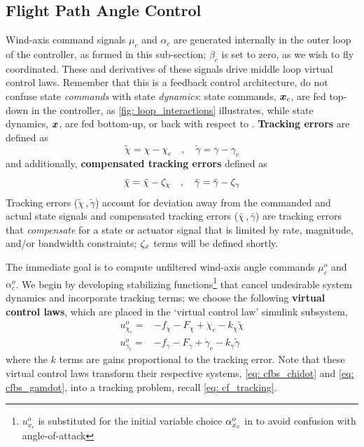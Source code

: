 \documentclass[12pt]{ucthesis}
\begin{document}
\subsection{Flight Path Angle Control}
\label{subsec: uav_flight_path}
%
Wind-axis command signals $\mu_c$ and $\alpha_c$ are generated internally in the outer loop of the controller, as formed in this sub-section; $\beta_c$ is set to zero, as we wish to fly coordinated. These and derivatives of these signals drive middle loop virtual control laws. Remember that this is a feedback control architecture, do not confuse state \textit{commands} with state \textit{dynamics}: state commands, $\boldsymbol{x}_c$, are fed top-down in the controller, as \autoref{fig: loop_interactions} illustrates, while state dynamics, $\boldsymbol{x}$, are fed bottom-up, or back with respect to . \textbf{Tracking errors} are defined as
	\begin{equation} \label{eq: cfbs_outer_etrk}
		\tilde{\chi}	= \chi	- \chi_c \quad,\quad
		\tilde{\gamma}	= \gamma- \gamma_c 
	\end{equation}
and additionally, \textbf{compensated tracking errors} defined as
	\begin{equation} \label{eq: cfbs_outer_ecmp}
		\bar{\chi}		= \tilde{\chi}	- \zeta_\chi \quad,\quad
		\bar{\gamma}	= \tilde{\gamma}- \zeta_\gamma
	\end{equation}
%
\indent Tracking errors ($\tilde{\chi}\,,\tilde{\gamma}$) account for deviation away from the commanded and actual state signals and compensated tracking errors ($\bar{\chi}\,,\bar{\gamma}$) are tracking errors that \textit{compensate} for a state or actuator signal that is limited by rate, magnitude, and/or bandwidth constraints; $\zeta_x$ terms will be defined shortly.

The immediate goal is to compute unfiltered wind-axis angle commands $\mu^o_c$ and $\alpha^o_c$. We begin by developing stabilizing functions\footnote{$u^{o}_{x_c}$ is substituted for the initial variable choice $\alpha^{o}_{x_c}$ in  to avoid confusion with angle-of-attack}  that cancel undesirable system dynamics and incorporate tracking terms; we choose the following \textbf{virtual control laws}, which are placed in the `virtual control law' simulink subsystem,
	\begin{align}
		\label{eq: cfbs_virt_chi}	u^{o}_{\chi_c} =& -f_{\chi} - F_{\chi} + \dot{\chi}_c - k_{\chi}\tilde{\chi} \\
		\label{eq: cfbs_virt_gam}	u^{o}_{\gamma_c} =& -f_{\gamma} - F_{\gamma} + \dot{\gamma}_c - k_{\gamma}\tilde{\gamma}
	\end{align}
where the $k$ terms are gains proportional to the tracking error. Note that these virtual control laws transform their respective systems, \ref{eq: cfbs_chidot} and \ref{eq: cfbs_gamdot}, into a tracking problem, recall \autoref{eq: cf_tracking}.
\end{document}
